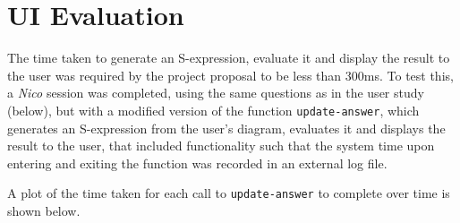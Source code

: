 \documentclass[12pt,twoside,notitlepage,xetex]{report}
\begin{document}
{\section{UI Evaluation}

The time taken to generate an S-expression, evaluate it and display the result to the user was required by the project proposal to be less than 300ms.  To test this, a \emph{Nico} session was completed, using the same questions as in the user study (below), but with a modified version of the function \verb¬update-answer¬, which generates an S-expression from the user's diagram, evaluates it and displays the result to the user, that included functionality such that the system time upon entering and exiting the function was recorded in an external log file.

A plot of the time taken for each call to \verb¬update-answer¬ to complete over time is shown below.

}
\end{document}

